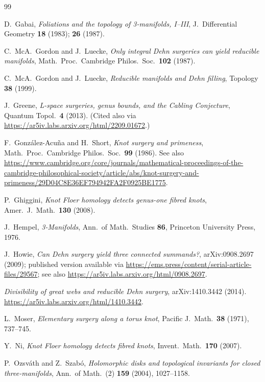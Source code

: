 \documentclass[11pt]{amsart}
\theoremstyle{definition}
\theoremstyle{remark}
\numberwithin{equation}{section}
\begin{document}
\begin{thebibliography}{99}\raggedright

 D.~Gabai,
\emph{Foliations and the topology of 3-manifolds, I--III},
J.\ Differential Geometry \textbf{18} (1983); \textbf{26} (1987).

 C.~McA.\ Gordon and J.~Luecke,
\emph{Only integral Dehn surgeries can yield reducible manifolds},
Math.\ Proc.\ Cambridge Philos.\ Soc.\ \textbf{102} (1987).

 C.~McA.\ Gordon and J.~Luecke,
\emph{Reducible manifolds and Dehn filling},
Topology \textbf{38} (1999).

 J.~Greene,
\emph{L-space surgeries, genus bounds, and the Cabling Conjecture},
Quantum Topol.\ \textbf{4} (2013). (Cited also via
\url{https://ar5iv.labs.arxiv.org/html/2209.01672}.)

 F.~Gonz\'alez-Acu\~na and H.~Short,
\emph{Knot surgery and primeness},
Math.\ Proc.\ Cambridge Philos.\ Soc.\ \textbf{99} (1986). See also
\url{https://www.cambridge.org/core/journals/mathematical-proceedings-of-the-cambridge-philosophical-society/article/abs/knot-surgery-and-primeness/29D04C8E36EF794942FA2F0925BE1775}.

 P.~Ghiggini,
\emph{Knot Floer homology detects genus-one fibred knots},
Amer.\ J.\ Math.\ \textbf{130} (2008).

 J.~Hempel,
\emph{3-Manifolds}, Ann.\ of Math.\ Studies \textbf{86},
Princeton University Press, 1976.

 J.~Howie,
\emph{Can Dehn surgery yield three connected summands?},
arXiv:0908.2697 (2009);
published version available via
\url{https://ems.press/content/serial-article-files/29567}; see also
\url{https://ar5iv.labs.arxiv.org/html/0908.2697}.

 \emph{Divisibility of great webs and reducible Dehn surgery},
arXiv:1410.3442 (2014).
\url{https://ar5iv.labs.arxiv.org/html/1410.3442}.

 L.~Moser,
\emph{Elementary surgery along a torus knot},
Pacific J.\ Math.\ \textbf{38} (1971), 737--745.

 Y.~Ni,
\emph{Knot Floer homology detects fibred knots},
Invent.\ Math.\ \textbf{170} (2007).

 P.~Ozsv\'ath and Z.~Szab\'o,
\emph{Holomorphic disks and topological invariants for closed
three-manifolds}, Ann.\ of Math.\ (2) \textbf{159} (2004), 1027--1158.


\end{thebibliography}
\end{document}
